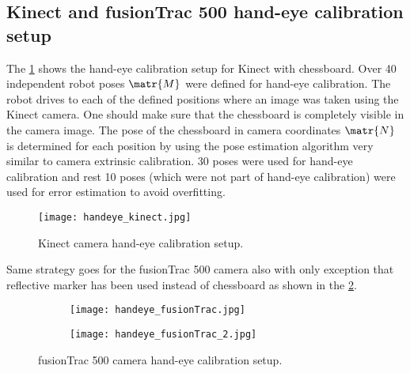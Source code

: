 \subsection{Kinect and fusionTrac 500 hand-eye calibration setup}

The \cref{fig:kinect_handeye_calibration_setup} shows the hand-eye calibration setup for Kinect with chessboard. Over 40 independent robot poses $\matr{M}$ were defined for hand-eye calibration. The robot drives to each of the defined positions where an image was taken using the Kinect camera. One should make sure that the chessboard is completely visible in the camera image. The pose of the chessboard in camera coordinates $\matr{N}$ is determined for each position by using the pose estimation algorithm very similar to camera extrinsic calibration. 30 poses were used for hand-eye calibration and rest 10 poses (which were not part of hand-eye calibration) were used for error estimation to avoid overfitting.

\begin{figure}[hbt!]
	\centering
	\texttt{[image: handeye\_kinect.jpg]}
	\caption{Kinect camera hand-eye calibration setup.} 
	\label{fig:kinect_handeye_calibration_setup}
\end{figure}

Same strategy goes for the fusionTrac 500 camera also with only exception that reflective marker has been used instead of chessboard as shown in the \cref{fig:handeye_fusionTrac}.\\

\begin{figure}[hbt!]
	\centering
	\begin{subfigure}{0.49\textwidth}
		\texttt{[image: handeye\_fusionTrac.jpg]}	
	\end{subfigure}
	\hfill
	\begin{subfigure}{0.49\textwidth}
		\texttt{[image: handeye\_fusionTrac\_2.jpg]}	
	\end{subfigure}
	\caption{fusionTrac 500 camera hand-eye calibration setup.} 
	\label{fig:handeye_fusionTrac}
\end{figure} 